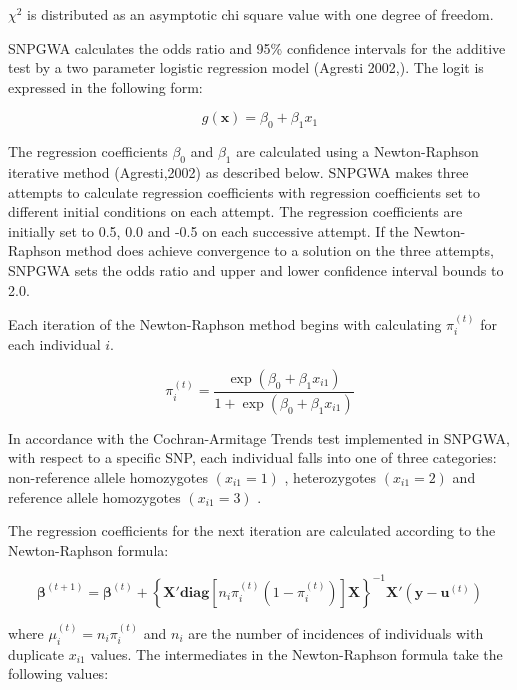 \begin{enumerate}
$\chi^2$ is distributed as an asymptotic chi square value with one degree of freedom.

SNPGWA calculates the odds ratio and 95\% confidence intervals for the additive
test by a two parameter logistic regression model (Agresti 2002,).  The logit is
expressed in the following form:

\vspace{1em}
\begin{equation*}
  g(\mathbf{x}) = \beta_0 + \beta_1x_1
\end{equation*}

The regression coefficients $\beta_0$ and $\beta_1$ are calculated using a
Newton-Raphson iterative method (Agresti,2002) as described below.  SNPGWA makes
three attempts to calculate regression coefficients with regression coefficients
set to different initial conditions on each attempt.  The regression
coefficients are initially set to 0.5, 0.0 and -0.5 on each successive attempt.
If the Newton-Raphson method does achieve convergence to a solution on the three
attempts, SNPGWA sets the odds ratio and upper and lower confidence interval
bounds to 2.0.

Each iteration of the Newton-Raphson method begins with calculating
$\pi_i^{(t)}$ for each individual $i$.

\begin{equation*}
  \pi_i^{(t)} = \frac{\exp(\beta_0 + \beta_1x_{i1})}{1+\exp(\beta_0 + \beta_1x_{i1})}
\end{equation*}

In accordance with the Cochran-Armitage Trends test implemented in SNPGWA, with
respect to a specific SNP, each individual falls into one of three categories:
non-reference allele homozygotes $(x_{i1}=1)$ , heterozygotes $(x_{i1}=2)$ and
reference allele homozygotes $(x_{i1}=3)$ .

The regression coefficients for the next iteration are calculated according to
the Newton-Raphson formula:

\begin{equation*}
  \boldsymbol{\beta}^{(t+1)} = \boldsymbol{\beta}^{(t)} + \left\{\mathbf{X'diag}[n_i\pi_i^{(t)}(1-\pi_i^{(t)})]\mathbf{X}\right\}^{-1}\mathbf{X'}(\mathbf{y}-\mathbf{u}^{(t)})
\end{equation*}

where $\mu_i^{(t)} = n_i\pi_i^{(t)}$ and $n_i$ are the number of incidences of
individuals with duplicate $x_{i1}$ values.  The intermediates in the
Newton-Raphson formula take the following values:


\end{enumerate}
